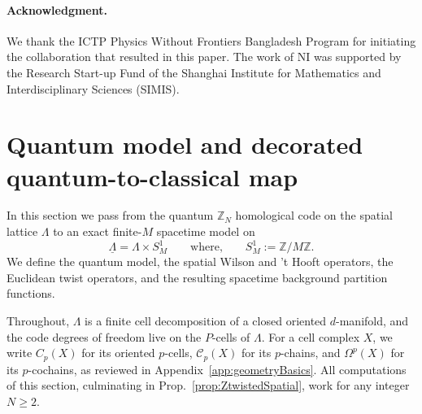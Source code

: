 \documentclass[dvipsnames,a4paper]{article}
\numberwithin{equation}{section}
\theoremstyle{definition}
\theoremstyle{remark}
\begin{document}
%	
%	





\paragraph{Acknowledgment.}
We thank the ICTP Physics Without Frontiers Bangladesh Program for initiating the collaboration that resulted in this paper. The work of NI was supported by the Research Start-up Fund of the Shanghai Institute for Mathematics and Interdisciplinary Sciences (SIMIS).






\section{Quantum model and decorated quantum-to-classical map}
\label{sec:quantum-classical}

In this section we pass from the quantum \(\mathbb Z_N\) homological code on the spatial
lattice \(\Lambda\) to an exact finite-\(M\) spacetime model on
\begin{equation}
\underline\Lambda=\Lambda\times S^1_M \qquad \text{where,} \qquad S_M^1 := \mathbb Z/M\mathbb Z.
\end{equation}
We define the quantum model, the spatial
Wilson and 't Hooft operators, the Euclidean twist operators, and the resulting spacetime
background partition functions.

Throughout, \(\Lambda\) is a finite cell decomposition of a closed
oriented \(d\)-manifold, and the code degrees of freedom live on the \(P\)-cells of
\(\Lambda\). For a cell complex \(X\), we write \(C_p(X)\) for its oriented
\(p\)-cells, \(\mathcal C_p(X)\) for its \(p\)-chains, and \(\Omega^p(X)\) for its
\(p\)-cochains, as reviewed in Appendix~\ref{app:geometryBasics}. All computations of this section, culminating in Prop.~\ref{prop:ZtwistedSpatial}, work for any integer $N \ge 2$.
\end{document}
